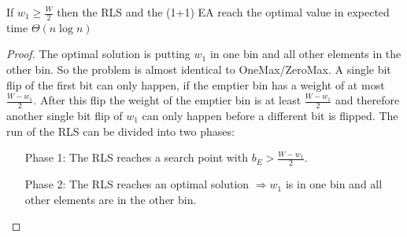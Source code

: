 \begin{theorem}\label{theo:OneMaxResult}
    If $w_1 \ge \frac W 2$  then the RLS and the (1+1) EA reach the optimal value in expected time $\Theta(n\log{}n)$
\end{theorem}
\begin{proof}
    The optimal solution is putting $w_1$ in one bin and all other elements in the other bin.
    So the problem is almost identical to OneMax/ZeroMax.
    A single bit flip of the first bit can only happen, if the emptier bin has a weight of at most $\frac {W-w_1}{2}$.
    After this flip the weight of the emptier bin is at least $\frac {W-w_1}{2}$ and therefore another single bit flip of $w_1$ can only happen before a different bit is flipped.
    The run of the RLS can be divided into two phases:
    \begin{itemize}
        \item[Phase 1:] The RLS reaches a search point with $b_E > \frac {W-w_1}{2}$.
        \item[Phase 2:] The RLS reaches an optimal solution $\Rightarrow w_1$ is in one bin and all other elements are in the other bin.
    \end{itemize}


\end{proof}

